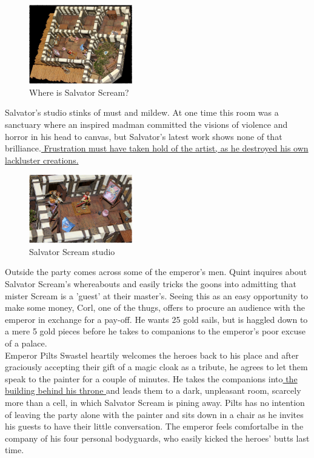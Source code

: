 \begin{figure}[h]
	\centering
	\includegraphics[width=0.4\textwidth]{images/Where-is-Salvator-Scream-562539967_mod.jpg}
	\caption{Where is Salvator Scream?}
	\label{fig:Where-is-Salvator-Scream-562539967}
\end{figure}

Salvator's studio stinks of must and mildew. At one time this room was a sanctuary where an inspired madman committed the visions of violence and horror in his head to canvas, but Salvator's latest work shows none of that brilliance.\hyperref[fig:Salvator-Scream-studio-562540993]{ Frustration must have taken hold of the artist, as he destroyed his own lackluster creations. }  \\

\begin{figure}[h]
	\centering
	\includegraphics[width=0.4\textwidth]{images/Salvator-Scream-studio-562540993_mod.jpg}
	\caption{Salvator Scream studio}
	\label{fig:Salvator-Scream-studio-562540993}
\end{figure}

Outside the party comes across some of the emperor's men. Quint inquires about Salvator Scream's whereabouts and easily tricks the goons into admitting that mister Scream is a 'guest' at their master's. Seeing this as an easy opportunity to make some money, Corl, one of the thugs, offers to procure an audience with the emperor in exchange for a pay-off. He wants 25 gold sails, but is haggled down to a mere 5 gold pieces before he takes to companions to the emperor's poor excuse of a palace.\\

Emperor Pilts Swastel heartily welcomes the heroes back to his place and after graciously accepting their gift of a magic cloak as a tribute, he agrees to let them speak to the painter for a couple of minutes. He takes the companions into\hyperref[fig:Pilts-Swastel-emperor-of-Old-Korvosa-562541723]{ the building behind his throne } and leads them to a dark, unpleasant room, scarcely more than a cell, in which Salvator Scream is pining away. Pilts has no intention of leaving the party alone with the painter and sits down in a chair as he invites his guests to have their little conversation. The emperor feels comfortalbe in the company of his four personal bodyguards, who easily kicked the heroes' butts last time. \\

